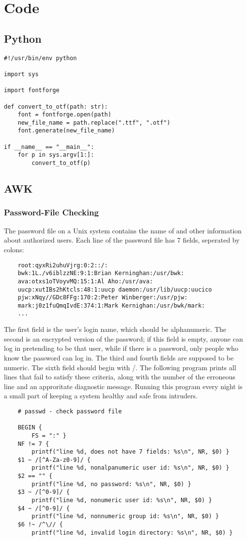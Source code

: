 \section{Code}
\subsection{Python}
\begin{verbatim}
#!/usr/bin/env python

import sys

import fontforge

def convert_to_otf(path: str):
    font = fontforge.open(path)
    new_file_name = path.replace(".ttf", ".otf")
    font.generate(new_file_name)

if __name__ == "__main__":
    for p in sys.argv[1:]:
        convert_to_otf(p)
\end{verbatim}

\subsection{AWK}
\subsubsection{Password-File Checking}
The password file on a Unix system contains the name of and other information
about authorized users. Each line of the password file has 7 fields, seperated
by colons:
\begin{verbatim}
    root:qyxRi2uhuVjrg:0:2::/:
    bwk:1L./v6iblzzNE:9:1:Brian Kerninghan:/usr/bwk:
    ava:otxs1oTVoyvMQ:15:1:Al Aho:/usr/ava:
    uucp:xutIBs2hKtcls:48:1:uucp daemon:/usr/lib/uucp:uucico
    pjw:xNqy//GDc8FFg:170:2:Peter Winberger:/usr/pjw:
    mark:j0z1fuQmqIvdE:374:1:Mark Kernighan:/usr/bwk/mark:
    ...
\end{verbatim}
The first field is the user's login name, which should be alphanumeric. The
second is an encrypted version of the password; if this field is empty, anyone
can log in pretending to be that user, while if there is a password, only
people who know the password can log in. The third and fourth fields are
supposed to be numeric. The sixth field should begin with /. The following
program prints all lines that fail to satisfy these criteria, along with the
number of the erroneous line and an approritate diagnostic message. Running
this program every night is a small part of keeping a system healthy and safe
from intruders.

\begin{verbatim}
    # passwd - check password file

    BEGIN {
        FS = ":" }
    NF != 7 {
        printf("line %d, does not have 7 fields: %s\n", NR, $0) }
    $1 ~ /[^A-Za-z0-9]/ {
        printf("line %d, nonalpanumeric user id: %s\n", NR, $0) }
    $2 == "" {
        printf("line %d, no password: %s\n", NR, $0) }
    $3 ~ /[^0-9]/ {
        printf("line %d, nonumeric user id: %s\n", NR, $0) }
    $4 ~ /[^0-9]/ {
        printf("line %d, nonnumeric group id: %s\n", NR, $0) }
    $6 !~ /^\// {
        printf("line %d, invalid login directory: %s\n", NR, $0) }
\end{verbatim}


